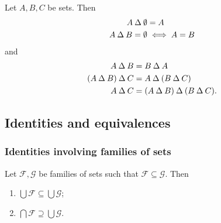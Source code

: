 \begin{lemma}
Let $A,B,C$ be sets. Then
\begin{align*}
A\mathbin{\Delta} \emptyset &= A \\
A\mathbin{\Delta} B = \emptyset &\iff A = B
\end{align*}
and
\begin{align*}
A \mathbin{\Delta} B &= B \mathbin{\Delta} A \\
(A \mathbin{\Delta} B) \mathbin{\Delta} C &= A \mathbin{\Delta} (B \mathbin{\Delta} C) \\
A \mathbin{\Delta} C &= (A \mathbin{\Delta} B)\mathbin{\Delta}(B \mathbin{\Delta} C).
\end{align*}
\end{lemma}

\subsection{Identities and equivalences}
\subsubsection{Identities involving families of sets}
\begin{lemma}
Let $\mathcal{F}, \mathcal{G}$ be families of sets such that $\mathcal{F}\subseteq \mathcal{G}$. Then
\begin{enumerate}
\item $\bigcup \mathcal{F} \subseteq \bigcup \mathcal{G}$;
\item $\bigcap \mathcal{F} \supseteq \bigcup \mathcal{G}$.
\end{enumerate}
\end{lemma}


